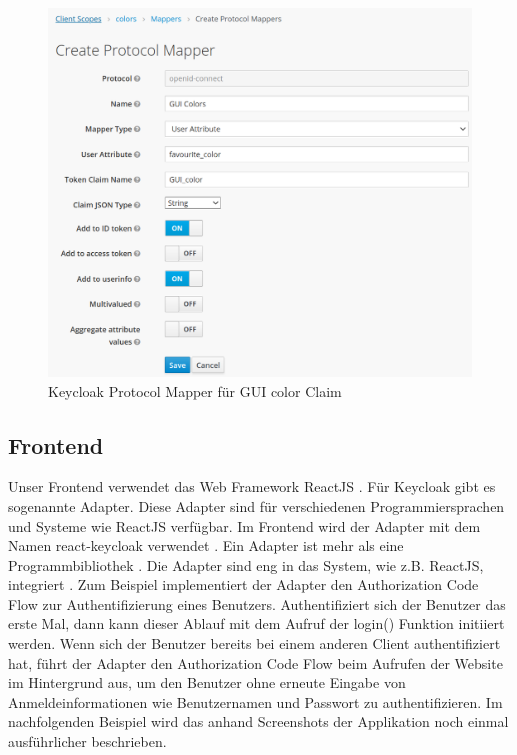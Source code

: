 \begin{figure}[!ht]
	\centering
	\includegraphics[width=1\textwidth]{Images/Ebert/KeycloakNewClaimProtocolMapper.PNG}
	\caption{Keycloak Protocol Mapper für GUI color Claim}
	\label{fig:EB_Keycloak Protocol Mapper fuer GUI color Claim}
\end{figure}



\subsection{Frontend}

Unser Frontend verwendet das Web Framework ReactJS \cite{EB43}. Für Keycloak gibt es sogenannte Adapter. Diese Adapter sind für verschiedenen Programmiersprachen und Systeme wie ReactJS verfügbar. Im Frontend wird der Adapter mit dem Namen react-keycloak verwendet \cite{EB36}. Ein Adapter ist mehr als eine Programmbibliothek \cite{EB43}. Die Adapter sind eng in das System, wie z.B. ReactJS, integriert \cite{EB43}. Zum Beispiel implementiert der Adapter den Authorization Code Flow zur Authentifizierung eines Benutzers. Authentifiziert sich der Benutzer das erste Mal, dann kann dieser Ablauf mit dem Aufruf der login() Funktion initiiert werden. Wenn sich der Benutzer bereits bei einem anderen Client authentifiziert hat, führt der Adapter den Authorization Code Flow beim Aufrufen der Website im Hintergrund aus, um den Benutzer ohne erneute Eingabe von Anmeldeinformationen wie Benutzernamen und Passwort zu authentifizieren. Im nachfolgenden Beispiel wird das anhand Screenshots der Applikation noch einmal ausführlicher beschrieben.

